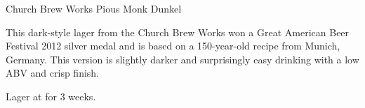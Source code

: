 \stylesection{\stylemunichdunkel}

\begin{recipie}{Church Brew Works Pious Monk Dunkel}

\begin{aboutblock}
This dark-style lager from the Church Brew Works won a Great American Beer
Festival 2012 silver medal and is based on a 150-year-old recipe from Munich,
Germany. This version is slightly darker and surprisingly easy drinking with
a low ABV and crisp finish. \sourceaha
\end{aboutblock}


\begin{methodandtiming}
 
\begin{mashsteps}
\mashdecoctthick{}
\mashdecoctboil{}

\end{mashsteps}

\begin{fermentationsteps}
\end{fermentationsteps}

\begin{directions}
Lager at  for 3 weeks.
\end{directions}

\end{methodandtiming}

\pagebreak

\begin{ingredientsblock}

\begin{malts}
\end{malts}

\begin{hops}
\end{hops}


\begin{twists}
\end{twists}

\end{ingredientsblock}

\end{recipie}
